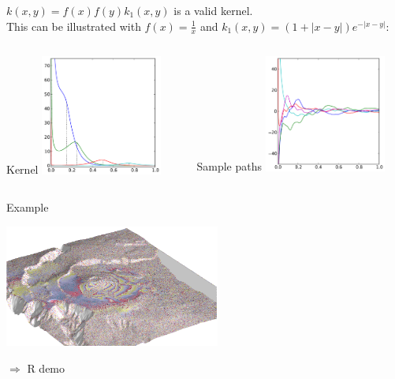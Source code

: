 \begin{frame}{}
\begin{example}
$k(x,y) = f(x)f(y)k_1(x,y)$ is a valid kernel.\\
\vspace{0.5cm}
This can be illustrated with $f(x) = \frac1x$ and $k_1(x,y) = (1 + |x-y|) e^{-|x-y|}$:\\
\begin{columns}[c]
\begin{column}{5cm}
\begin{center}
Kernel
\includegraphics[width=4cm]{3_gaussian_process_regression/figures/python/newfromold-prodfunc-k}
\end{center}
\end{column}
\begin{column}{5cm}
\begin{center}
Sample paths
\includegraphics[width=4cm]{3_gaussian_process_regression/figures/python/newfromold-prodfunc-traj}
\end{center}
\end{column}
\end{columns}
\end{example}
\end{frame}


\begin{frame}{}
\begin{exampleblock}{Example}
\begin{center}
\includegraphics[height=4cm]{1_stat_models/figures/piton_fournaise_5dike_intrusions_98_00} 
\end{center}
\end{exampleblock}
\alert{$\Rightarrow$ R demo}
\end{frame}


